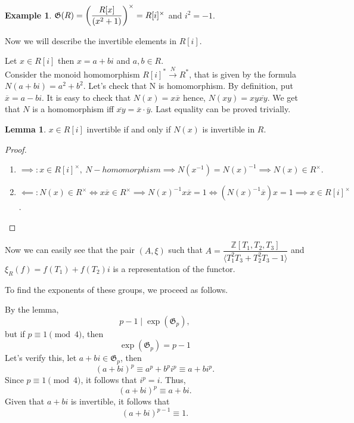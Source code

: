 \documentclass{article}
\theoremstyle{definition}
\newtheorem{example}{Example}
\theoremstyle{definition}
\newtheorem{lemma}{Lemma}
\begin{document}
\begin{example}
    $\mathfrak{G}(R) =  \Large{\left( \dfrac{R[x]}{ (x^2+1)}\right)^{\times}} = 
    R[i]^{\times}$ and $i^2 = -1$.


    Now we will describe the invertible elements in $R[i].$

    Let $x \in R[i]$ then $x = a + bi$ and $a, b \in R$.\\
    Consider the monoid homomorphism $R[i]^*  \xrightarrow{\ N\ } R^*$, that is given by the formula $N(a+bi) = a^2 + b^2.$
    Let's check that N is homomorphism.
    By definition, put $\overline{x} = a - bi$. It is easy to check that $N(x) = x\overline{x}$ hence, $N(xy) = 
    xy\overline{xy}$.
    We get that $N$ is a homomorphism iff $\overline{xy} = \overline{x}\cdot\overline{y}.$
    Last equality can be proved trivially.

    \begin{lemma}
        $x \in R[i]$ invertible if and only if $N(x)$ is invertible in $R$.
    \end{lemma}

    \begin{proof}
    \hspace*{5cm}
    \begin{enumerate}  
         \item $\implies: x \in R[i]^{\times},\ N - homomorphism \implies N(x^{-1}) = N(x)^{-1} \implies N(x)  \in R^{\times}.$
        \item $\impliedby:N(x) \in R^{\times} \iff x\overline{x} \in R^{\times} \implies N(x)^{-1}x\overline{x} = 
        1 \iff (N(x)^{-1}\overline{x})x = 1\implies x \in R[i]^{\times}$.
    \end{enumerate}
    \end{proof}



Now we can easily see that the pair $(A, \xi)$ such that 
$A = \dfrac{\mathbb{Z}[T_1, T_2, T_3]}{\langle T_1^2T_3+T_2^2T_3-1\rangle}$ and $\xi_R(f)=f(T_1)+f(T_2)i$ is a representation 
of the functor.

To find the exponents of these groups, we proceed as follows.
    
    By the lemma, \[ p-1 \mid \operatorname{exp}(\mathfrak{G}_p), \] but if \( p \equiv 1 \pmod{4} \), then 
    $$\operatorname{exp}(\mathfrak{G}_p) =  p-1$$
     Let's verify this, let  \( a + bi \in \mathfrak{G}_p \), then
    \[
    (a + bi)^p \equiv a^p + b^p i^p \equiv a + bi^p.
    \]
    Since \( p \equiv 1 \pmod{4} \), it follows that \( i^p = i \). Thus,
    \[
    (a + bi)^p \equiv a + bi.
    \]
    Given that \( a + bi \) is invertible, it follows that
    \[
    (a + bi)^{p-1} \equiv 1.
    \]
    

\end{example}
\end{document}
